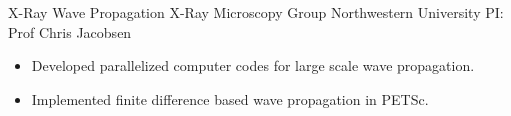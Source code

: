 

        {X-Ray Wave Propagation}
        {\newline X-Ray Microscopy Group}
        {Northwestern University}
        {PI: Prof Chris Jacobsen}{
    \begin{itemize}
		\item Developed parallelized computer codes for large scale wave propagation.
		\item Implemented finite difference based wave propagation in PETSc.
    \end{itemize}
	}

